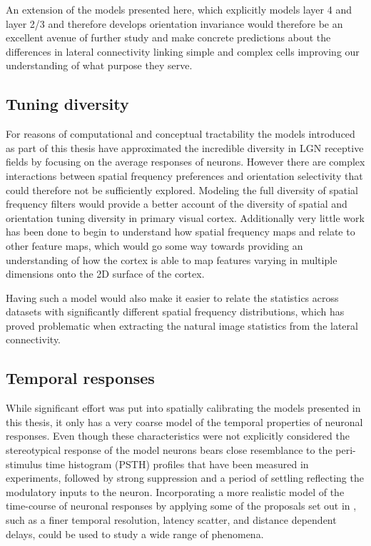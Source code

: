 An extension of the models presented here, which explicitly models
layer 4 and layer 2/3 and therefore develops orientation invariance
would therefore be an excellent avenue of further study and make
concrete predictions about the differences in lateral connectivity
linking simple and complex cells improving our understanding of what
purpose they serve.

\subsection{Tuning diversity}

For reasons of computational and conceptual tractability the models
introduced as part of this thesis have approximated the incredible
diversity in LGN receptive fields by focusing on the average responses
of neurons. However there are complex interactions between spatial
frequency preferences and orientation selectivity that could therefore
not be sufficiently explored. Modeling the full diversity of spatial
frequency filters would provide a better account of the diversity of
spatial and orientation tuning diversity in primary visual
cortex. Additionally very little work has been done to begin to
understand how spatial frequency maps and relate to other feature
maps, which would go some way towards providing an understanding of
how the cortex is able to map features varying in multiple dimensions
onto the 2D surface of the cortex.

Having such a model would also make it easier to relate the statistics
across datasets with significantly different spatial frequency
distributions, which has proved problematic when extracting the
natural image statistics from the lateral connectivity.

\subsection{Temporal responses}

While significant effort was put into spatially calibrating the models
presented in this thesis, it only has a very coarse model of the
temporal properties of neuronal responses. Even though these
characteristics were not explicitly considered the stereotypical
response of the model neurons bears close resemblance to the
peri-stimulus time histogram (PSTH) profiles that have been measured
in experiments, followed by strong suppression and a period of
settling reflecting the modulatory inputs to the neuron. Incorporating
a more realistic model of the time-course of neuronal responses by
applying some of the proposals set out in \cite{Stevens2016}, such as
a finer temporal resolution, latency scatter, and distance dependent
delays, could be used to study a wide range of phenomena.

